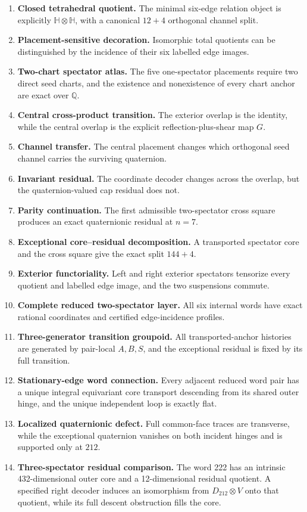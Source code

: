 \documentclass[
  11pt,
  a4paper,
]{article}
\begin{document}
\begin{enumerate}
\def\labelenumi{\arabic{enumi}.}
\item
  \textbf{Closed tetrahedral quotient.} The minimal six-edge relation
  object is explicitly \(\mathbb H\otimes\mathbb H\), with a canonical
  \(12+4\) orthogonal channel split.
\item
  \textbf{Placement-sensitive decoration.} Isomorphic total quotients
  can be distinguished by the incidence of their six labelled edge
  images.
\item
  \textbf{Two-chart spectator atlas.} The five one-spectator placements
  require two direct seed charts, and the existence and nonexistence of
  every chart anchor are exact over \(\mathbb Q\).
\item
  \textbf{Central cross-product transition.} The exterior overlap is the
  identity, while the central overlap is the explicit
  reflection-plus-shear map \(G\).
\item
  \textbf{Channel transfer.} The central placement changes which
  orthogonal seed channel carries the surviving quaternion.
\item
  \textbf{Invariant residual.} The coordinate decoder changes across the
  overlap, but the quaternion-valued cap residual does not.
\item
  \textbf{Parity continuation.} The first admissible two-spectator cross
  square produces an exact quaternionic residual at \(n=7\).
\item
  \textbf{Exceptional core--residual decomposition.} A transported
  spectator core and the cross square give the exact split \(144+4\).
\item
  \textbf{Exterior functoriality.} Left and right exterior spectators
  tensorize every quotient and labelled edge image, and the two
  suspensions commute.
\item
  \textbf{Complete reduced two-spectator layer.} All six internal words
  have exact rational coordinates and certified edge-incidence profiles.
\item
  \textbf{Three-generator transition groupoid.} All transported-anchor
  histories are generated by pair-local \(A,B,S\), and the exceptional
  residual is fixed by its full transition.
\item
  \textbf{Stationary-edge word connection.} Every adjacent reduced word
  pair has a unique integral equivariant core transport descending from
  its shared outer hinge, and the unique independent loop is exactly
  flat.
\item
  \textbf{Localized quaternionic defect.} Full common-face traces are
  transverse, while the exceptional quaternion vanishes on both incident
  hinges and is supported only at \(212\).
\item
  \textbf{Three-spectator residual comparison.} The word 222 has an
  intrinsic 432-dimensional outer core and a 12-dimensional residual
  quotient. A specified right decoder induces an isomorphism from
  \(D_{212}\otimes V\) onto that quotient, while its full descent
  obstruction fills the core.
\end{enumerate}
\end{document}

